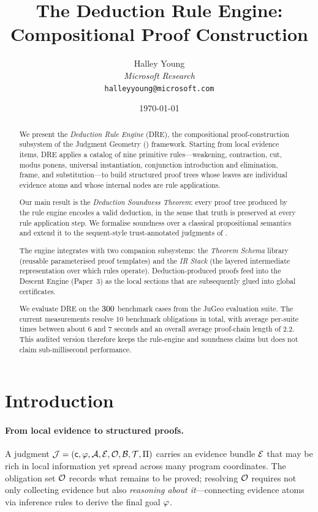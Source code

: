 \documentclass[11pt]{article}
\title{\textbf{The Deduction Rule Engine:\\
        Compositional Proof Construction}}
\author{%
  Halley Young\\
  \textit{Microsoft Research}\\
  \texttt{halleyyoung@microsoft.com}
}
\date{\today}
\begin{document}
\maketitle

\begin{abstract}
We present the \emph{Deduction Rule Engine} (\textsc{DRE}), the
compositional proof-construction subsystem of the Judgment Geometry
(\JuGeo{}) framework.  Starting from local evidence items, \textsc{DRE}
applies a catalog of nine primitive rules---weakening, contraction, cut,
modus ponens, universal instantiation, conjunction introduction and
elimination, frame, and substitution---to build structured proof trees
whose leaves are individual evidence atoms and whose internal nodes are
rule applications.

Our main result is the \emph{Deduction Soundness Theorem}: every
proof tree produced by the rule engine encodes a valid deduction, in the
sense that truth is preserved at every rule application step.  We
formalise soundness over a classical propositional semantics and
extend it to the sequent-style trust-annotated judgments of \JuGeo{}.

The engine integrates with two companion subsystems: the
\emph{Theorem Schema} library (reusable parameterised proof templates)
and the \emph{IR Stack} (the layered intermediate representation
over which rules operate).  Deduction-produced proofs feed into the
Descent Engine (Paper~3) as the local sections that are subsequently
glued into global certificates.

We evaluate \textsc{DRE} on the $300$ benchmark cases from the
JuGeo evaluation suite.  The current measurements resolve 10 benchmark
obligations in total, with average per-suite times between about 6 and
7 seconds and an overall average proof-chain length of 2.2.  This
audited version therefore keeps the rule-engine and soundness claims but
does not claim sub-millisecond performance.
\end{abstract}

\newpage

\section{Introduction}\label{sec:intro}

\paragraph{From local evidence to structured proofs.}
A \JuGeo{} judgment $\mathcal{J} = (\mathsf{c},\varphi,\mathcal{A},\mathcal{E},\mathcal{O},\mathcal{B},
\mathcal{T},\Pi)$ carries an evidence bundle $\mathcal{E}$ that may be rich in
local information yet spread across many program coordinates.  The
obligation set $\mathcal{O}$ records what remains to be proved; resolving
$\mathcal{O}$ requires not only collecting evidence but also \emph{reasoning
about it}---connecting evidence atoms via inference rules to derive the
final goal $\varphi$.
\end{document}

